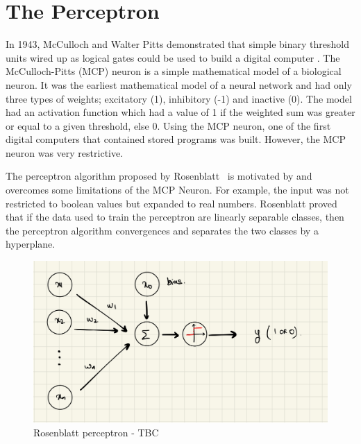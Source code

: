 \section{The Perceptron}
In 1943, McCulloch and Walter Pitts demonstrated that simple binary threshold units wired up as logical gates could be used to build a digital computer \cite{McCulloch:1943aa}. The McCulloch-Pitts (MCP) neuron is a simple mathematical model of a biological neuron. It was the earliest mathematical model of a neural network and had only three types of weights; excitatory (1), inhibitory (-1) and inactive (0). The model had an activation function which had a value of 1 if the weighted sum was greater or equal to a given threshold, else 0. Using the MCP neuron, one of the first digital computers that contained stored programs was built. However, the MCP neuron was very restrictive.
\par The perceptron algorithm proposed by Rosenblatt~\cite{Rosenblatt:1958aa} is motivated by and overcomes some limitations of the MCP Neuron. For example, the input was not restricted to boolean values but expanded to real numbers. Rosenblatt proved that if the data used to train the perceptron are linearly separable classes, then the perceptron algorithm convergences and separates the two classes by a hyperplane.

\begin{figure}[H]
  \centering
  \includegraphics[scale=0.15]{CHAPTER_2/c2_fig_perceptron_2.jpeg}
  \caption{Rosenblatt perceptron - TBC}
  \label{rosenblatt_perceptron}
\end{figure}

